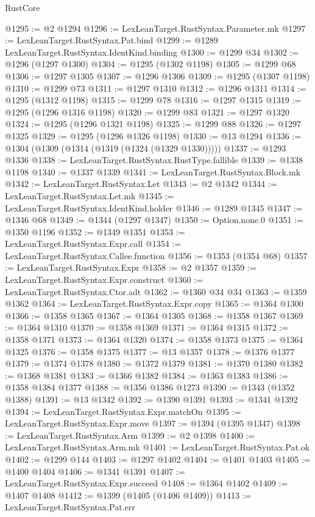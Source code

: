 \begin{lexlean}{RustCore}
\begin{coremodule}
{\begin{coremodule}
{{{{{{{{{{{{{{{{{{{{{{{{{{{{{{{{{{{{{{{{{{{{@1295 := @2 @1294
@1296 := LexLeanTarget.RustSyntax.Parameter.mk
@1297 := LexLeanTarget.RustSyntax.Pat.bind
@1299 := @1289 LexLeanTarget.RustSyntax.IdentKind.binding
@1300 := @1299 @34
@1302 := @1296 (@1297 @1300)
@1304 := @1295 (@1302 @1198)
@1305 := @1299 @68
@1306 := @1297 @1305
@1307 := @1296 @1306
@1309 := @1295 (@1307 @1198)
@1310 := @1299 @73
@1311 := @1297 @1310
@1312 := @1296 @1311
@1314 := @1295 (@1312 @1198)
@1315 := @1299 @78
@1316 := @1297 @1315
@1319 := @1295 (@1296 @1316 @1198)
@1320 := @1299 @83
@1321 := @1297 @1320
@1324 := @1295 (@1296 @1321 @1198)
@1325 := @1299 @88
@1326 := @1297 @1325
@1329 := @1295 (@1296 @1326 @1198)
@1330 := @13 @1294
@1336 := @1304 (@1309 (@1314 (@1319 (@1324 (@1329 @1330)))))
@1337 := @1293 @1336
@1338 := LexLeanTarget.RustSyntax.RustType.fallible
@1339 := @1338 @1198
@1340 := @1337 @1339
@1341 := LexLeanTarget.RustSyntax.Block.mk
@1342 := LexLeanTarget.RustSyntax.Let
@1343 := @2 @1342
@1344 := LexLeanTarget.RustSyntax.Let.mk
@1345 := LexLeanTarget.RustSyntax.IdentKind.holder
@1346 := @1289 @1345
@1347 := @1346 @68
@1349 := @1344 (@1297 @1347)
@1350 := Option.none.{0}
@1351 := @1350 @1196
@1352 := @1349 @1351
@1353 := LexLeanTarget.RustSyntax.Expr.call
@1354 := LexLeanTarget.RustSyntax.Callee.function
@1356 := @1353 (@1354 @68)
@1357 := LexLeanTarget.RustSyntax.Expr
@1358 := @2 @1357
@1359 := LexLeanTarget.RustSyntax.Expr.construct
@1360 := LexLeanTarget.RustSyntax.Ctor.adt
@1362 := @1360 @34 @34
@1363 := @1359 @1362
@1364 := LexLeanTarget.RustSyntax.Expr.copy
@1365 := @1364 @1300
@1366 := @1358 @1365
@1367 := @1364 @1305
@1368 := @1358 @1367
@1369 := @1364 @1310
@1370 := @1358 @1369
@1371 := @1364 @1315
@1372 := @1358 @1371
@1373 := @1364 @1320
@1374 := @1358 @1373
@1375 := @1364 @1325
@1376 := @1358 @1375
@1377 := @13 @1357
@1378 := @1376 @1377
@1379 := @1374 @1378
@1380 := @1372 @1379
@1381 := @1370 @1380
@1382 := @1368 @1381
@1383 := @1366 @1382
@1384 := @1363 @1383
@1386 := @1358 @1384 @1377
@1388 := @1356 @1386 @1273
@1390 := @1343 (@1352 @1388)
@1391 := @13 @1342
@1392 := @1390 @1391
@1393 := @1341 @1392
@1394 := LexLeanTarget.RustSyntax.Expr.matchOn
@1395 := LexLeanTarget.RustSyntax.Expr.move
@1397 := @1394 (@1395 @1347)
@1398 := LexLeanTarget.RustSyntax.Arm
@1399 := @2 @1398
@1400 := LexLeanTarget.RustSyntax.Arm.mk
@1401 := LexLeanTarget.RustSyntax.Pat.ok
@1402 := @1299 @144
@1403 := @1297 @1402
@1404 := @1401 @1403
@1405 := @1400 @1404
@1406 := @1341 @1391
@1407 := LexLeanTarget.RustSyntax.Expr.succeed
@1408 := @1364 @1402
@1409 := @1407 @1408
@1412 := @1399 (@1405 (@1406 @1409))
@1413 := LexLeanTarget.RustSyntax.Pat.err
}}}}}}}}}}}}}}}}}}}}}}}}}}}}}}}}}}}}}}}}}}}}
\end{coremodule}}
\end{coremodule}
\end{lexlean}
